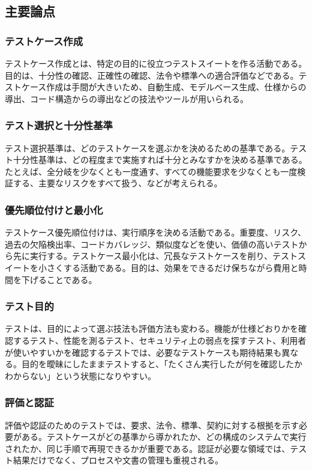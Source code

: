 \documentclass[uplatex,dvipdfmx,a4paper,11pt,nomag]{jsarticle}
\begin{document}
\subsection{主要論点}
\subsubsection{テストケース作成}
テストケース作成とは、特定の目的に役立つテストスイートを作る活動である。目的は、十分性の確認、正確性の確認、法令や標準への適合評価などである。テストケース作成は手間が大きいため、自動生成、モデルベース生成、仕様からの導出、コード構造からの導出などの技法やツールが用いられる。

\subsubsection{テスト選択と十分性基準}
テスト選択基準は、どのテストケースを選ぶかを決めるための基準である。テスト十分性基準は、どの程度まで実施すれば十分とみなすかを決める基準である。たとえば、全分岐を少なくとも一度通す、すべての機能要求を少なくとも一度検証する、主要なリスクをすべて扱う、などが考えられる。

\subsubsection{優先順位付けと最小化}
テストケース優先順位付けは、実行順序を決める活動である。重要度、リスク、過去の欠陥検出率、コードカバレッジ、類似度などを使い、価値の高いテストから先に実行する。テストケース最小化は、冗長なテストケースを削り、テストスイートを小さくする活動である。目的は、効果をできるだけ保ちながら費用と時間を下げることである。

\subsubsection{テスト目的}
テストは、目的によって選ぶ技法も評価方法も変わる。機能が仕様どおりかを確認するテスト、性能を測るテスト、セキュリティ上の弱点を探すテスト、利用者が使いやすいかを確認するテストでは、必要なテストケースも期待結果も異なる。目的を曖昧にしたままテストすると、「たくさん実行したが何を確認したかわからない」という状態になりやすい。

\subsubsection{評価と認証}
評価や認証のためのテストでは、要求、法令、標準、契約に対する根拠を示す必要がある。テストケースがどの基準から導かれたか、どの構成のシステムで実行されたか、同じ手順で再現できるかが重要である。認証が必要な領域では、テスト結果だけでなく、プロセスや文書の管理も重視される。
\end{document}
